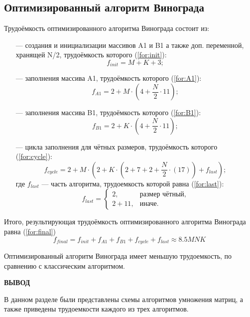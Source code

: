 \subsection{Оптимизированный алгоритм Винограда}
Трудоёмкость оптимизированного алгоритма Винограда состоит из:
\begin{itemize}
	\item[---] создания и инициализации массивов A1 и B1 а также доп. переменной, хранящей N/2, трудоёмкость которого (\ref{for:init}):
	\begin{equation}
		\label{for:init}
		f_{init} = M + K + 3;
	\end{equation}
	
	\item[---] заполнения массива A1, трудоёмкость которого (\ref{for:A1}):
	\begin{equation}
		\label{for:A1}
		f_{A1} = 2 + M \cdot (4 + \frac{N}{2} \cdot 11);
	\end{equation}
	
	\item[---] заполнения массива B1, трудоёмкость которого (\ref{for:B1}):
	\begin{equation}
		\label{for:B1}
		f_{B1} = 2 + K \cdot (4 + \frac{N}{2} \cdot 11);
	\end{equation}
	
	\item[---] цикла заполнения для чётных размеров, трудоёмкость которого (\ref{for:cycle}):
	\begin{equation}
		\label{for:cycle}
		f_{cycle} = 2 + M \cdot (2 + K \cdot (2 + 7 + 2 + \frac{N}{2} \cdot (17)) + f_{last});		
	\end{equation}
	где $f_{last}$ ---  часть алгоритма, трудоемкость которой равна (\ref{for:last}):
	\begin{equation}
		\label{for:last}
		f_{last} = \begin{cases}
			2, & \text{размер чётный,}\\
			2 + 11, & \text{иначе.}
		\end{cases}
	\end{equation}
\end{itemize}

Итого, результирующая трудоёмкость оптимизированного алгоритма Винограда равна (\ref{for:final})
\begin{equation}
	\label{for:final}
	f_{final} = f_{init} + f_{A1} + f_{B1} + f_{cycle} + f_{last} \approx 8.5MNK
\end{equation}

Оптимизированный алгоритм Винограда имеет меньшую трудоемкость, по сравнению с классическим алгоритмом.

\vspace{5mm}

\textbf{ВЫВОД}

 В данном разделе были представлены схемы алгоритмов умножения матриц, а также приведены трудоемкости каждого из трех алгоритмов.

\clearpage